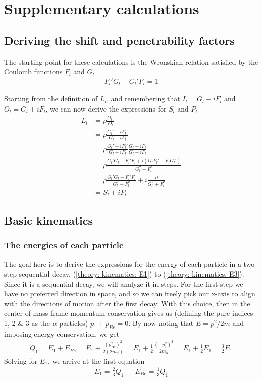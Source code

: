 \appendix
\section{Supplementary calculations}
\subsection{Deriving the shift and penetrability factors}\label{appendix: shift and pen}
The starting point for these calculations is the Wronskian relation satisfied by the Coulomb functions $F_l$ and $G_l$
\begin{align*}
	F_l'G_l - G_l'F_l = 1
\end{align*}

Starting from the definition of $L_l$, and remembering that $I_l = G_l - iF_l$ and $O_l = G_l + iF_l$, we can now derive the expressions for $S_l$ and $P_l$
\begin{align*}
	L_l &= \rho \frac{O_l'}{O_l}\\
	&= \rho\frac{G_l'+iF_l'}{G_l+iF_l}\\
	&=\rho\frac{G_l'+iF_l'}{G_l+iF_l}\frac{G_l-iF_l}{G_l-iF_l}\\
	&=\rho\frac{G_l'G_l+F_l'F_l+i(G_lF_l'-F_lG_l')}{G_l^2 + F_l^2}\\
	&=\rho\frac{G_l'G_l+F_l'F_l}{G_l^2+F_l^2} + i\frac{\rho}{G_l^2+F_l^2}\\
	&=S_l + iP_l
\end{align*}

\subsection{Basic kinematics} \label{appendix: kinematics}
\subsubsection{The energies of each particle}
The goal here is to derive the expressions for the energy of each particle in a two-step sequential decay, (\ref{theory: kinematics: E1}) to (\ref{theory: kinematics: E3}). \\

Since it is a sequential decay, we will analyze it in steps. For the first step we have no preferred direction in space, and so we can freely pick our x-axis to align with the directions of motion after the first decay. With this choice, then in the center-of-mass frame momentum conservation gives us (defining the pure indices 1, 2 \& 3 as the $\alpha$-particles) $p_1 + p_{Be} = 0$. By now noting that $E = p^2/2m$ and imposing energy conservation, we get
\begin{align*}
	Q_1 = E_1 + E_{Be} = E_1 + \frac{(p^x_{Be})^2}{2(2m_{\alpha})} = E_1 + \frac{1}{2}\frac{(-p^x_1)^2}{2m_{\alpha}} = E_1 + \frac{1}{2}E_1 = \frac{3}{2}E_1
\end{align*}
Solving for $E_1$, we arrive at the first equation
\begin{align*}
	E_1 = \frac{2}{3}Q_1 && E_{Be} = \frac{1}{3}Q_1
\end{align*}

